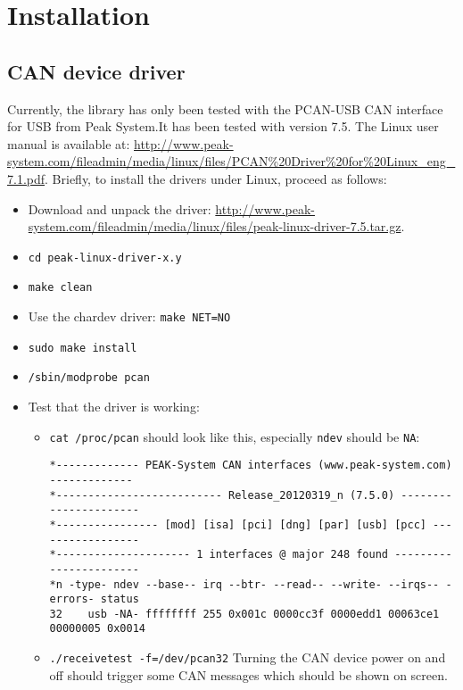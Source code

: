 \chapter{Installation}
\label{chap:installation}

\section{CAN device driver}
\label{chap:installation:devicedriver}

Currently, the library has only been tested with the PCAN-USB CAN interface for USB from Peak System.It has been tested with version 7.5. The Linux user manual is available at: \url{http://www.peak-system.com/fileadmin/media/linux/files/PCAN%20Driver%20for%20Linux_eng_7.1.pdf}. Briefly, to install the drivers under Linux, proceed as follows:
  \begin{itemize}
  \item Download and unpack the driver: \url{http://www.peak-system.com/fileadmin/media/linux/files/peak-linux-driver-7.5.tar.gz}.
  \item \texttt{cd peak-linux-driver-x.y}
  \item \texttt{make clean}
  \item Use the chardev driver: \texttt{make NET=NO}
  \item \texttt{sudo make install}
  \item \texttt{/sbin/modprobe pcan}


  \item Test that the driver is working:
    \begin{itemize}
    \item \texttt{cat /proc/pcan} should look like this, especially \texttt{ndev} should be \texttt{NA}:
{\scriptsize
\begin{verbatim}
*------------- PEAK-System CAN interfaces (www.peak-system.com) -------------
*-------------------------- Release_20120319_n (7.5.0) ----------------------
*---------------- [mod] [isa] [pci] [dng] [par] [usb] [pcc] -----------------
*--------------------- 1 interfaces @ major 248 found -----------------------
*n -type- ndev --base-- irq --btr- --read-- --write- --irqs-- -errors- status
32    usb -NA- ffffffff 255 0x001c 0000cc3f 0000edd1 00063ce1 00000005 0x0014
\end{verbatim}}
\item \texttt{./receivetest -f=/dev/pcan32} Turning the CAN device power on and off should trigger some CAN messages which should be shown on screen.
    \end{itemize}
  \end{itemize}

